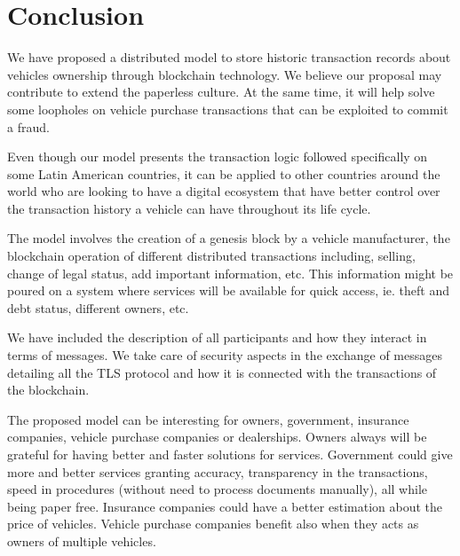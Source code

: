\section{Conclusion}
We have proposed a distributed model to store historic transaction 
records about vehicles ownership through blockchain technology.
We believe our proposal may contribute to extend the paperless culture.
At the same time, it will help solve some loopholes on vehicle purchase transactions
that can be exploited to commit a fraud. 

Even though our model presents the transaction logic 
followed specifically on some Latin American countries, 
it can be applied to other countries around the world 
who are looking to have a digital ecosystem 
that have better control over the transaction history a vehicle can have 
throughout its life cycle.

The model involves the creation of a genesis block by a vehicle manufacturer,
the blockchain operation of different distributed transactions including, selling,
change of legal status, add important information, etc. 
This information might be poured on a system 
where services will be available for quick access, ie. theft and debt status, 
different owners, etc.

We have included the description of all participants and how they interact in terms of 
messages. 
We take care of security aspects in the exchange of messages 
detailing all the TLS protocol and how it is connected with the transactions of the blockchain.

The proposed model can be interesting for owners, government, insurance companies, 
vehicle purchase companies or dealerships. 
Owners always will be grateful for having better and faster solutions for services. 
Government could give more and better services granting accuracy, transparency in the transactions, 
speed in procedures (without need to process documents manually), all while being paper free. 
Insurance companies could have a better estimation about the price of vehicles. 
Vehicle purchase companies benefit also when they acts as owners of multiple vehicles.

